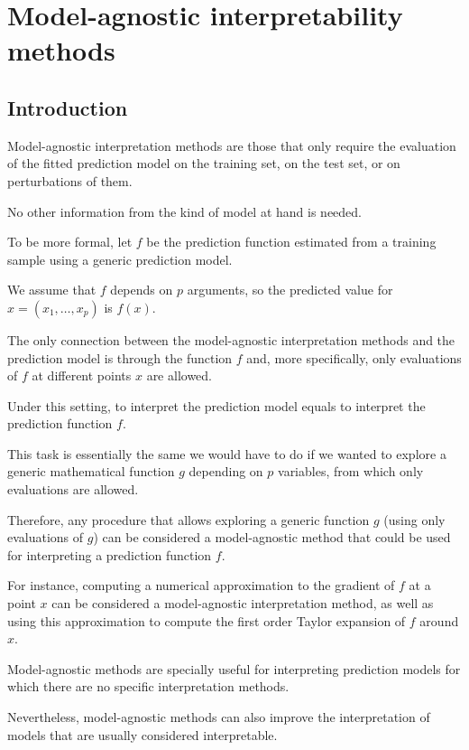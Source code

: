 \chapter{Model-agnostic interpretability methods}

\section{Introduction}

Model-agnostic interpretation methods are those that only require
the evaluation of the fitted prediction model on the training set, on
the test set, or on perturbations of them.

No other information from the kind of model at hand is needed.

To be more formal, let $f$ be the prediction function estimated from a
training sample using a generic prediction model.

We assume that $f$ depends on $p$ arguments, so the predicted value
for $x = (x_1, \dots , x_p)$ is $f(x)$.

The only connection between the model-agnostic interpretation
methods and the prediction model is through the function $f$ and,
more specifically, only evaluations of $f$ at different points $x$ are
allowed.

Under this setting, to interpret the prediction model equals to
interpret the prediction function $f$.

This task is essentially the same we would have to do if we wanted
to explore a generic mathematical function $g$ depending on $p$
variables, from which only evaluations are allowed.

Therefore, any procedure that allows exploring a generic function $g$
(using only evaluations of $g$) can be considered a model-agnostic
method that could be used for interpreting a prediction function $f$.

For instance, computing a numerical approximation to the gradient
of $f$ at a point $x$ can be considered a model-agnostic interpretation
method, as well as using this approximation to compute the first
order Taylor expansion of $f$ around $x$.

Model-agnostic methods are specially useful for interpreting
prediction models for which there are no specific interpretation
methods.

Nevertheless, model-agnostic methods can also improve the
interpretation of models that are usually considered interpretable.

